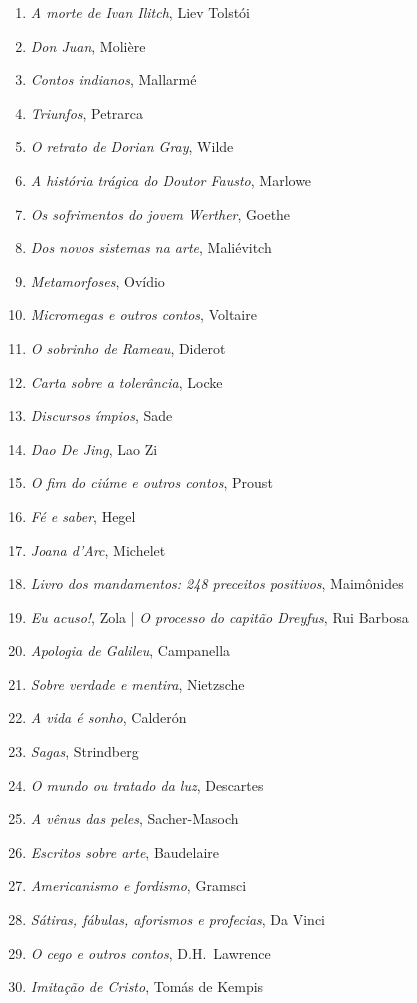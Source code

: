 \begin{enumerate}
\item \textit{A morte de Ivan Ilitch}, Liev Tolstói 
\item \textit{Don Juan}, Molière
\item \textit{Contos indianos}, Mallarmé
\item \textit{Triunfos}, Petrarca
\item \textit{O retrato de Dorian Gray}, Wilde
\item \textit{A história trágica do Doutor Fausto}, Marlowe
\item \textit{Os sofrimentos do jovem Werther}, Goethe
\item \textit{Dos novos sistemas na arte}, Maliévitch
\item \textit{Metamorfoses}, Ovídio
\item \textit{Micromegas e outros contos}, Voltaire
\item \textit{O sobrinho de Rameau}, Diderot
\item \textit{Carta sobre a tolerância}, Locke
\item \textit{Discursos ímpios}, Sade
\item \textit{Dao De Jing}, Lao Zi
\item \textit{O fim do ciúme e outros contos}, Proust
\item \textit{Fé e saber}, Hegel
\item \textit{Joana d'Arc}, Michelet
\item \textit{Livro dos mandamentos: 248 preceitos positivos}, Maimônides
\item \textit{Eu acuso!}, Zola | \textit{O processo do capitão Dreyfus}, Rui Barbosa
\item \textit{Apologia de Galileu}, Campanella 
\item \textit{Sobre verdade e mentira}, Nietzsche
\item \textit{A vida é sonho}, Calderón
\item \textit{Sagas}, Strindberg
\item \textit{O mundo ou tratado da luz}, Descartes
\item \textit{A vênus das peles}, Sacher{}-Masoch
\item \textit{Escritos sobre arte}, Baudelaire
\item \textit{Americanismo e fordismo}, Gramsci
\item \textit{Sátiras, fábulas, aforismos e profecias}, Da Vinci
\item \textit{O cego e outros contos}, D.H.~Lawrence
\item \textit{Imitação de Cristo}, Tomás de Kempis

\end{enumerate}
